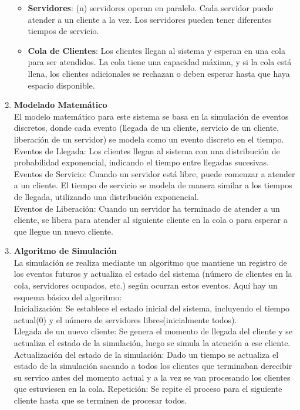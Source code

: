 \documentclass[article]{amsart}
\begin{document}
\begin{enumerate}
\begin{itemize}
\item    \textbf{Servidores}: (n) servidores operan en paralelo. Cada servidor puede atender a un cliente a la vez. Los servidores pueden tener diferentes tiempos de servicio.\\
\item    \textbf{Cola de Clientes}: Los clientes llegan al sistema y esperan en una cola para ser atendidos. La cola tiene una capacidad máxima, y si la cola está llena, los clientes adicionales se rechazan o deben esperar hasta que haya espacio disponible.\\

\end{itemize}
\item \textbf{Modelado Matemático}\\

El modelo matemático para este sistema se basa en la simulación de eventos discretos, donde cada evento (llegada de un cliente, servicio de un cliente, liberación de un servidor) se modela como un evento discreto en el tiempo.\\

    Eventos de Llegada: Los clientes llegan al sistema con una distribución de probabilidad exponencial, indicando el tiempo entre llegadas sucesivas.\\
    Eventos de Servicio: Cuando un servidor está libre, puede comenzar a atender a un cliente. El tiempo de servicio se modela de manera similar a los tiempos de llegada, utilizando una distribución exponencial.\\
    Eventos de Liberación: Cuando un servidor ha terminado de atender a un cliente, se libera para atender al siguiente cliente en la cola o para esperar a que llegue un nuevo cliente.\\

\item \textbf{Algoritmo de Simulación}\\

La simulación se realiza mediante un algoritmo que mantiene un registro de los eventos futuros y actualiza el estado del sistema (número de clientes en la cola, servidores ocupados, etc.) según ocurran estos eventos. Aquí hay un esquema básico del algoritmo:\\

    Inicialización: Se establece el estado inicial del sistema, incluyendo el tiempo actual(0) y el número de servidores libres(inicialmente todos).\\
    Llegada de un nuevo cliente: Se genera el momento de llegada del cliente y se actualiza el estado de la simulaci\'on, luego se simula la atenci\'on a ese cliente.
    Actualizaci\'on del estado de la simulaci\'on: Dado un tiempo se actualiza el estado de la simulaci\'on sacando a todos los clientes que terminaban derecibir su servico antes del momento actual  y a la vez se van procesando los clientes que estuviesen en la cola.
    Repetición: Se repite el proceso para el siguiente cliente hasta que se terminen de procesar todos.\\


\end{enumerate}
\end{document}
